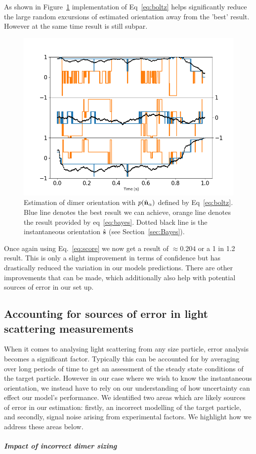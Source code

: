 As shown in Figure~\ref{fig:biased} implementation of Eq~\eqref{eq:boltz} helps significantly reduce the large random excursions of estimated orientation away from the 'best' result. However at the same 
time result is still subpar.
\begin{figure}[h]
	\centering
	\includegraphics[width=\textwidth]{fig8a.png}
	\caption{\label{fig:biased}
		Estimation of dimer orientation with $p(\hat{\bf n}_\alpha)$ defined
		by Eq~\eqref{eq:boltz}.  Blue line denotes the best result we can
		achieve, orange line denotes the result provided by eq~\ref{eq:bayes}.
		Dotted black line is the instantaneous orientation $\hat{\bf s}$ (see Section~\ref{sec:Bayes}).
	}
\end{figure} 

Once again using Eq.~\eqref{eq:score} we now get a result of 
$\approx 0.204$ or a 1 in 1.2 result. This is only a slight 
improvement in terms of confidence but has drastically reduced 
the variation in our models predictions. There are other 
improvements that can be made, which additionally also help with
potential sources of error in our set up.

\subsection{Accounting for sources of error in light scattering measurements}
When it comes to analysing light scattering from any size particle,
error analysis becomes a significant factor. Typically this can be 
accounted for by averaging over long periods of time to get an 
assessment of the steady state conditions of the target particle. 
However in our case where we wish to know the instantaneous 
orientation, we instead have to rely on our understanding of how 
uncertainty can effect our model's performance. We identified two 
areas which are likely sources of error in our estimation: firstly, 
an incorrect modelling of the target particle, and secondly, signal 
noise arising from experimental factors. We highlight how we address 
these areas below. 
\subparagraph{Impact of incorrect dimer sizing}
\label{sec:lam}

